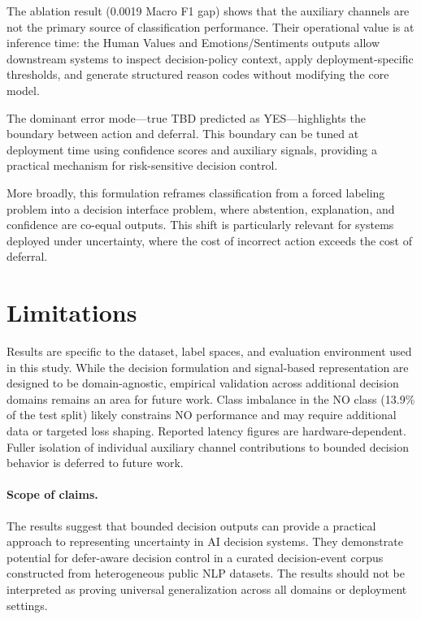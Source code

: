 \documentclass[11pt]{article}
\begin{document}
The ablation result (0.0019 Macro F1 gap) shows that the auxiliary channels are
not the primary source of classification performance. Their operational value is
at inference time: the Human Values and Emotions/Sentiments outputs allow
downstream systems to inspect decision-policy context, apply deployment-specific
thresholds, and generate structured reason codes without modifying the core
model.

The dominant error mode—true TBD predicted as YES—highlights the boundary between
action and deferral. This boundary can be tuned at deployment time using
confidence scores and auxiliary signals, providing a practical mechanism for
risk-sensitive decision control.

More broadly, this formulation reframes classification from a forced labeling
problem into a decision interface problem, where abstention, explanation, and
confidence are co-equal outputs. This shift is particularly relevant for systems
deployed under uncertainty, where the cost of incorrect action exceeds the cost
of deferral.

\section{Limitations}

Results are specific to the dataset, label spaces, and evaluation environment used in this study.
While the decision formulation and signal-based representation are designed to be domain-agnostic,
empirical validation across additional decision domains remains an area for future work.
Class imbalance in the NO class (13.9\% of the test split) likely constrains NO performance 
and may require additional data or targeted loss shaping. Reported latency figures are hardware-dependent.
Fuller isolation of individual auxiliary channel contributions to bounded decision behavior is
deferred to future work.

\paragraph{Scope of claims.}
The results suggest that bounded decision outputs can provide a practical approach to representing
uncertainty in AI decision systems. They demonstrate potential for defer-aware decision control in a
curated decision-event corpus constructed from heterogeneous public NLP datasets. The results should
not be interpreted as proving universal generalization across all domains or deployment settings.
\end{document}
